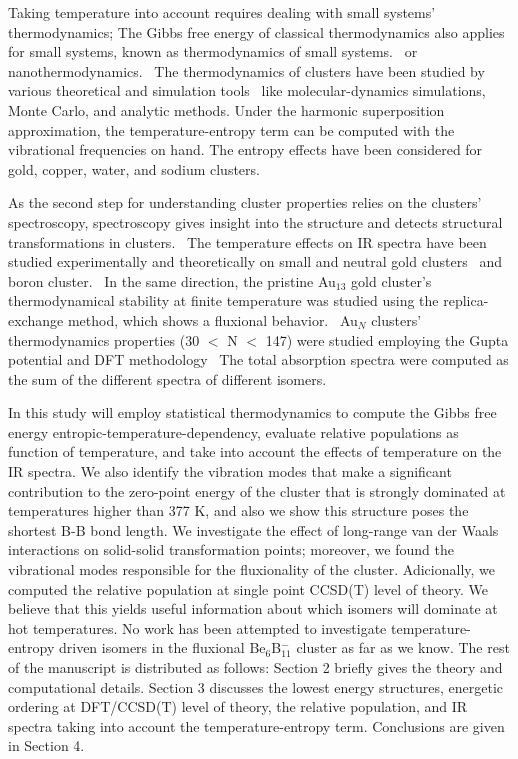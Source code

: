 \documentclass[prb,aps,preprint,showkeys,showpacs]{revtex4}
\begin{document}
Taking temperature into account requires dealing with small systems' thermodynamics; The Gibbs free energy of classical thermodynamics also applies for small systems, known as thermodynamics of small systems.~\cite{Simon,Hill2,gibbs1961} or nanothermodynamics.~\cite{Li-Truhlar} The thermodynamics of clusters have been studied by various theoretical and simulation tools~\cite{Baletto,Hill,Simon,Calvo,Bixon,Kristensen,Wales925,Seitsonen,jena1992physics,Fox} like molecular-dynamics simulations,~\cite{Gerardo} Monte Carlo, and analytic methods. Under the harmonic superposition approximation, the temperature-entropy term can be computed with the vibrational frequencies on hand. The entropy effects have been considered for gold, copper, water, and sodium clusters.~\cite{Ghiringhelli_2013,Schebarchov,Goldsmith,C1FD00027F,Grigoryan,Zhen-Long,Malloum,Malloum2,Malloum3,Fifen}

As the second step for understanding cluster properties relies on the clusters’ spectroscopy, spectroscopy gives insight into the structure and detects structural transformations in clusters.~\cite{Gruene674,doi:10.1021/ja0509230,PhysRevLett.93.023401} The temperature effects on IR spectra have been studied experimentally and theoretically on small and neutral gold clusters~\cite{Ghiringhelli_2013,Goldsmith} and boron cluster.~\cite{Fagiani} In the same direction, the pristine Au$_{13}$ gold cluster's thermodynamical stability at finite temperature was studied using the replica-exchange method, which shows a fluxional behavior.~\cite{C1FD00027F} Au$_N$ clusters' thermodynamics properties (30 $<$ N $<$ 147) were studied  employing  the Gupta potential and DFT methodology~\cite{Schebarchov} The total absorption spectra were computed as the sum of the different spectra of different isomers.~\cite{Felix}

In this study will employ statistical thermodynamics to compute the Gibbs free energy entropic-temperature-dependency, evaluate relative populations as function of  temperature, and take into account the effects of temperature on the IR spectra. We also identify the vibration modes that make a significant contribution to the zero-point energy of the cluster that is strongly dominated at temperatures higher than 377 K, and also we show this structure poses the shortest B-B bond length. We investigate the effect of long-range van der Waals interactions on solid-solid transformation points; moreover, we found the vibrational modes responsible for the fluxionality of the cluster. Adicionally, we computed the relative population at single point CCSD(T) level of theory.  We believe that this yields useful information about which isomers will dominate at hot temperatures. No work has been attempted to investigate temperature-entropy driven isomers in the fluxional Be$_6$B$_{11}^{-}$ cluster as far as we know. The rest of the manuscript is distributed as follows: Section 2 briefly gives the theory and computational details. Section 3 discusses the lowest energy structures, energetic ordering at DFT/CCSD(T) level of theory, the relative population, and IR spectra taking into account the temperature-entropy term. Conclusions are given in Section 4.
\end{document}
